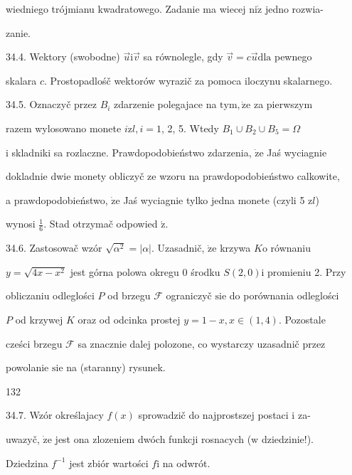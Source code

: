 \documentclass[a4paper,12pt]{article}
\begin{document}
wiedniego trójmianu kwadratowego. Zadanie ma wiecej $\mathrm{n}\mathrm{i}\dot{\mathrm{z}}$ jedno rozwia-

zanie.

34.4. Wektory (swobodne) $\vec{u}\mathrm{i}\vec{v}$ sa równolegle, gdy $\vec{v}=c\vec{u}\mathrm{d}\mathrm{l}\mathrm{a}$ pewnego

skalara $c$. Prostopadlośč wektorów wyrazič za pomoca iloczynu skalarnego.

34.5. Oznaczyč przez $B_{i}$ zdarzenie polegajace na $\mathrm{t}\mathrm{y}\mathrm{m}, \dot{\mathrm{z}}\mathrm{e}$ za pierwszym

razem wylosowano monete $i \mathrm{z}l, i = 1$, 2, 5. Wtedy $B_{1}\cup B_{2}\cup B_{5} = \Omega$

$\mathrm{i}$ skladniki sa rozlaczne. Prawdopodobieństwo zdarzenia, $\dot{\mathrm{z}}\mathrm{e}$ Jaś wyciagnie

dokladnie dwie monety obliczyč ze wzoru na prawdopodobieństwo calkowite,

a prawdopodobieństwo, $\dot{\mathrm{z}}\mathrm{e}$ Jaś wyciagnie tylko jedna monete (czyli 5 $\mathrm{z}l$)

wynosi $\displaystyle \frac{1}{6}$. Stad otrzymač odpowied $\acute{\mathrm{z}}.$

34.6. Zastosowač wzór $\sqrt{\alpha^{2}}=|\alpha|$. Uzasadnič, $\dot{\mathrm{z}}\mathrm{e}$ krzywa $K\mathrm{o}$ równaniu

$y=\sqrt{4x-x^{2}}$ jest górna polowa okregu $0$ środku $S(2,0)\mathrm{i}$ promieniu 2. Przy

obliczaniu odleglości $P$ od brzegu $\mathcal{F}$ ograniczyč $\mathrm{s}\mathrm{i}\mathrm{e}$ do porównania odleglości

$P$ od krzywej $K$ oraz od odcinka prostej $y=1-x,  x\in (1,4)$. Pozostale

cześci brzegu $\mathcal{F}$ sa znacznie dalej polozone, co wystarczy uzasadnič przez

powolanie $\mathrm{s}\mathrm{i}\mathrm{e}$ na (staranny) rysunek.





132

34.7. Wzór określajacy $f(x)$ sprowadzič do najprostszej postaci $\mathrm{i}$ za-

uwazyč, $\dot{\mathrm{z}}\mathrm{e}$ jest ona zlozeniem dwóch funkcji rosnacych ($\mathrm{w}$ dziedzinie!).

Dziedzina $f^{-1}$ jest zbiór wartości $f\mathrm{i}$ na odwrót.
\end{document}
